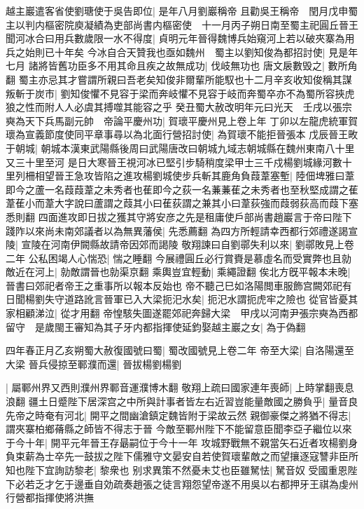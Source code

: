 越主巖遣客省使劉瑭使于吳告即位|{
	是年八月劉巖稱帝}
且勸吳王稱帝　閏月戊申蜀主以判内樞密院庾凝績為吏部尚書内樞密使　十一月丙子朔日南至蜀主祀圓丘晉王聞河冰合曰用兵數歲限一水不得度|{
	貞明元年晉得魏博兵始窺河上若以破夾寨為用兵之始則已十年矣}
今冰自合天贊我也亟如魏州　蜀主以劉知俊為都招討使|{
	見是年七月}
諸將皆舊功臣多不用其命且疾之故無成功|{
	伐岐無功也}
唐文扆數毁之|{
	數所角翻}
蜀主亦忌其才嘗謂所親曰吾老矣知俊非爾輩所能馭也十二月辛亥收知俊稱其謀叛斬于炭市|{
	劉知俊懼不見容于梁而奔岐懼不見容于岐而奔蜀卒亦不為蜀所容挾虎狼之性而附人人必虞其搏噬其能容之乎}
癸丑蜀大赦改明年元曰光天　壬戌以張宗奭為天下兵馬副元帥　帝論平慶州功|{
	賀瓌平慶州見上卷上年}
丁卯以左龍虎統軍賀瓌為宣義節度使同平章事尋以為北面行營招討使|{
	為賀瓌不能拒晉張本}
戊辰晉王畋于朝城|{
	朝城本漢東武陽縣後周曰武陽唐改曰朝城九域志朝城縣在魏州東南八十里又三十里至河}
是日大寒晉王視河冰已堅引步騎稍度梁甲士三千戍楊劉城緣河數十里列柵相望晉王急攻皆陷之進攻楊劉城使步兵斬其鹿角負葭葦塞塹|{
	陸佃埤雅曰葦即今之蘆一名葭葭葦之未秀者也萑即今之荻一名蒹蒹萑之未秀者也至秋堅成謂之萑葦萑小而葦大字說曰蘆謂之葭其小曰萑荻謂之兼其小曰葦荻強而葭弱荻高而葭下塞悉則翻}
四面進攻即日拔之獲其守將安彦之先是租庸使戶部尚書趙巖言于帝曰陛下踐阼以來尚未南郊議者以為無異藩侯|{
	先悉薦翻}
為四方所輕請幸西都行郊禮遂謁宣陵|{
	宣陵在河南伊闕縣故請帝因郊而謁陵}
敬翔諫曰自劉鄩失利以來|{
	劉鄩敗見上卷二年}
公私困竭人心惴恐|{
	惴之睡翻}
今展禮圓丘必行賞賚是慕虛名而受實弊也且勍敵近在河上|{
	勍敵謂晉也勍渠京翻}
乘輿豈宜輕動|{
	乘繩證翻}
俟北方旣平報本未晚|{
	晉書曰郊祀者帝王之重事所以報本反始也}
帝不聽己巳如洛陽閲車服飾宫闕郊祀有日聞楊劉失守道路訛言晉軍已入大梁扼汜水矣|{
	扼汜水謂扼虎牢之險也}
從官皆憂其家相顧涕泣|{
	從才用翻}
帝惶駭失圖遂罷郊祀奔歸大梁　甲戌以河南尹張宗奭為西都留守　是歲閩王審知為其子牙内都指揮使延鈞娶越主巖之女|{
	為于偽翻}


四年春正月乙亥朔蜀大赦復國號曰蜀|{
	蜀改國號見上卷二年}
帝至大梁|{
	自洛陽還至大梁}
晉兵侵掠至鄆濮而還|{
	晉拔楊劉楊劉}


|{
	屬鄆州界又西則濮州界鄆音運濮博木翻}
敬翔上疏曰國家連年喪師|{
	上時掌翻喪息浪翻}
疆土日蹙陛下居深宫之中所與計事者皆左右近習豈能量敵國之勝負乎|{
	量音良}
先帝之時奄有河北|{
	開平之間幽滄鎮定魏皆附于梁故云然}
親御豪傑之將猶不得志|{
	謂夾寨柏鄉蓨縣之師皆不得志于晉}
今敵至鄆州陛下不能留意臣聞李亞子繼位以來于今十年|{
	開平元年晉王存朂嗣位于今十一年}
攻城野戰無不親當矢石近者攻楊劉身負束薪為士卒先一鼓拔之陛下儒雅守文晏安自若使賀瓌輩敵之而望攘逐寇讐非臣所知也陛下宜詢訪黎老|{
	黎衆也}
别求異策不然憂未艾也臣雖駑怯|{
	駑音奴}
受國重恩陛下必若乏才乞于邊垂自効疏奏趙張之徒言翔怨望帝遂不用吳以右都押牙王祺為虔州行營都指揮使將洪撫

